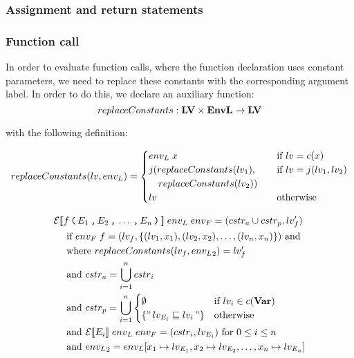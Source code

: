 \subsubsection{Assignment and return statements}


\subsubsection{Function call}
In order to evaluate function calls, where the function declaration uses constant parameters, we need to replace these constants with the corresponding argument label.
In order to do this, we declare an auxiliary function:
\[ replaceConstants : \mathbf{LV} \times \mathbf{EnvL} \rightarrow \mathbf{LV} \]

with the following definition:

\[replaceConstants(lv, {env_L}) = \begin{cases}
  {env_L} \; x & \quad \text{if } lv = c(x) \\
  j(replaceConstants(lv_1), & \quad \text{if } lv = j(lv_1, lv_2) \\
  \quad replaceConstants(lv_2)) & \\
  lv & \quad \text{otherwise}
\end{cases} \]

\begin{align*}
& \mathcal{E}[\![ f \, \texttt{(} \, E_1 \, \texttt{,} \, E_2 \, \texttt{,} \, \dots \, \texttt{,} \, E_n \, \texttt{)} \, ]\!] \; {env_L} \; {env_F} = (cstr_a \cup cstr_p, lv_f') \\
& \quad \text{ if } {env_F} \; f = (lv_f, \{(lv_1, x_1), (lv_2, x_2), \dots, (lv_n, x_n)\}) \text{ and} \\
& \quad \text{ where } replaceConstants(lv_f, {env_L}_2) = lv_f' \\
& \quad \text{ and } {cstr}_a = \bigcup\limits_{i=1}^n {cstr}_i \\
& \quad \text{ and } {cstr}_p = \bigcup\limits_{i=1}^n
  \begin{cases}
    \emptyset &\text{if } lv_i \in c(\mathbf{Var})\\
    \{ "\,lv_{E_i} \sqsubseteq lv_i\," \} & \text{otherwise}
  \end{cases} \\
& \quad \text{ and } \mathcal{E}[\![ E_i ]\!] \; {env_L} \; {env_F} = (cstr_i, lv_{E_i}) \text{ for } 0 \leq i \leq n \\
& \quad \text{ and } {env_L}_2 = {env_L}[x_1 \mapsto lv_{E_1}, x_2 \mapsto lv_{E_2}, \dots, x_n \mapsto lv_{E_n}]
\end{align*}
